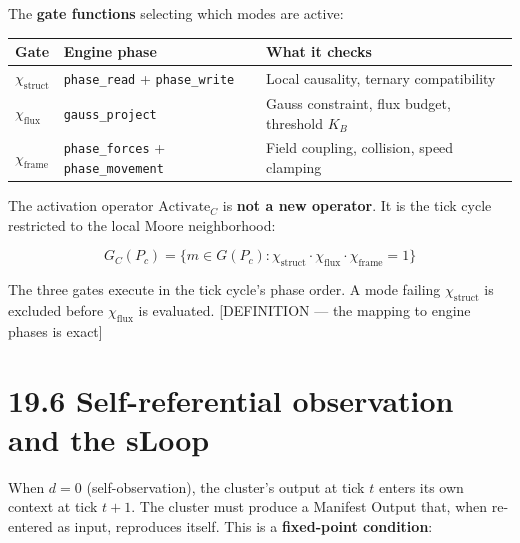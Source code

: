 \documentclass[
  11pt,
  letterpaper,
  twoside,
  openright]{book}
\begin{document}
The \textbf{gate functions} selecting which modes are active:

\begin{longtable}[]{@{}
  >{\raggedright\arraybackslash}p{}
  >{\raggedright\arraybackslash}p{}
  >{\raggedright\arraybackslash}p{}@{}}
\toprule\noalign{}
\begin{minipage}[b]{\linewidth}\raggedright
Gate
\end{minipage} & \begin{minipage}[b]{\linewidth}\raggedright
Engine phase
\end{minipage} & \begin{minipage}[b]{\linewidth}\raggedright
What it checks
\end{minipage} \\
\midrule\noalign{}
\endhead
\bottomrule\noalign{}
\endlastfoot
\(\chi_{\text{struct}}\) & \texttt{phase\_read} + \texttt{phase\_write}
& Local causality, ternary compatibility \\
\(\chi_{\text{flux}}\) & \texttt{gauss\_project} & Gauss constraint,
flux budget, threshold \(K_B\) \\
\(\chi_{\text{frame}}\) & \texttt{phase\_forces} +
\texttt{phase\_movement} & Field coupling, collision, speed clamping \\
\end{longtable}

The activation operator \(\text{Activate}_C\) is \textbf{not a new
operator}. It is the tick cycle restricted to the local Moore
neighborhood:

\[
G_C(P_c) = \{ m \in G(P_c) : \chi_{\text{struct}} \cdot \chi_{\text{flux}} \cdot \chi_{\text{frame}} = 1 \}
\]

The three gates execute in the tick cycle's phase order. A mode failing
\(\chi_{\text{struct}}\) is excluded before \(\chi_{\text{flux}}\) is
evaluated. {[}DEFINITION --- the mapping to engine phases is exact{]}

\section{19.6 Self-referential observation and the
sLoop}\label{self-referential-observation-and-the-sloop}

When \(d = 0\) (self-observation), the cluster's output at tick \(t\)
enters its own context at tick \(t+1\). The cluster must produce a
Manifest Output that, when re-entered as input, reproduces itself. This
is a \textbf{fixed-point condition}:
\end{document}
